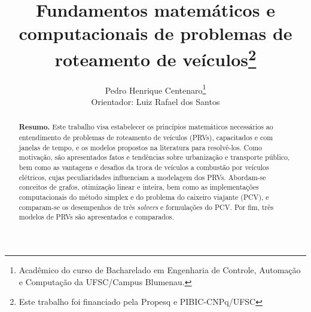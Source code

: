 \documentclass[a4paper, 12pt, bibliography=totoc]{scrartcl}
\title{Fundamentos matemáticos e computacionais de problemas de roteamento de veículos\thanks{Este trabalho foi financiado pela Propesq e PIBIC-CNPq/UFSC}}
\author{Pedro Henrique Centenaro\thanks{Acadêmico do curso de Bacharelado em Engenharia de Controle, Automação e Computação da UFSC/Campus Blumenau.} \\ Orientador: Luiz Rafael dos Santos}
\date{}
\theoremstyle{plain}%
\theoremstyle{definition}
\theoremstyle{remark}
\begin{document}
\onehalfspacing
\maketitle
\renewcommand\thelinenumber{\textcolor{darkgray}{\arabic{linenumber}}}

\begin{abstract}
   \textbf{Resumo.} Este trabalho visa estabelecer os princípios matemáticos necessários ao entendimento de problemas de roteamento de veículos (PRVs), capacitados e com janelas de tempo, e os modelos propostos na literatura para resolvê-los. Como motivação, são apresentados fatos e tendências sobre urbanização e transporte público, bem como as vantagens e desafios da troca de veículos a combustão por veículos elétricos, cujas peculiaridades influenciam a modelagem dos PRVs. Abordam-se conceitos de grafos, otimização linear e inteira, bem como as implementações computacionais do método simplex e do problema do caixeiro viajante (PCV), e comparam-se os desempenhos de três \emph{solvers} e formulações do PCV. Por fim, três modelos de PRVs são apresentados e comparados.
\end{abstract}

\newpage
\tableofcontents
\newpage








\printbibliography

\appendix


\end{document}
